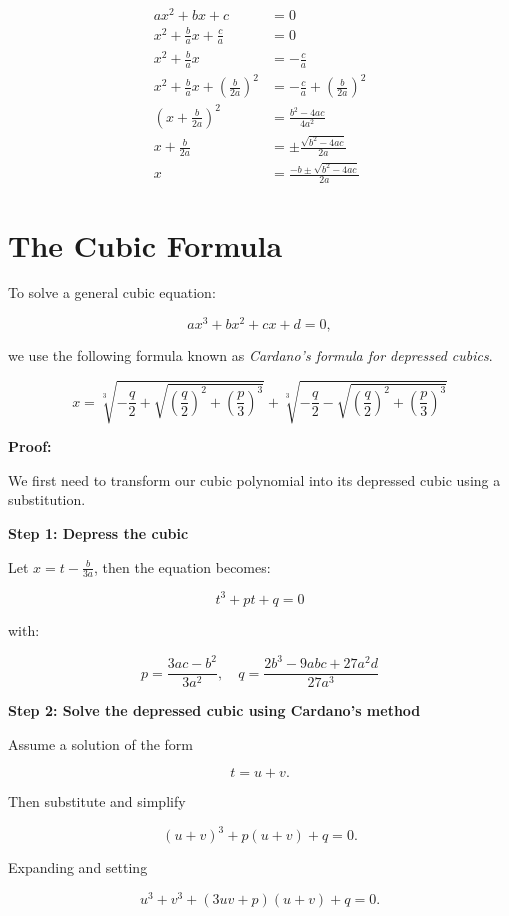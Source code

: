 \begin{align*}
    ax^2 + bx + c &= 0 \\
    x^2 + \frac{b}{a}x + \frac{c}{a} &= 0 \\
    x^2 + \frac{b}{a}x &= -\frac{c}{a} \\
    x^2 + \frac{b}{a}x + {\left(\frac{b}{2a}\right)}^2 &= -\frac{c}{a} + {\left(\frac{b}{2a}\right)}^2 \\
    {\left(x + \frac{b}{2a}\right)}^2 &= \frac{b^2 - 4ac}{4a^2} \\
    x + \frac{b}{2a} &= \pm \frac{\sqrt{b^2 - 4ac}}{2a} \\
    x &= \frac{-b \pm \sqrt{b^2 - 4ac}}{2a}
\end{align*}

\section{The Cubic Formula}

To solve a general cubic equation:

\[
    ax^3 + bx^2 + cx + d = 0,
\]

we use the following formula known as \emph{Cardano’s formula for depressed cubics}.

\[
    x = \sqrt[3]{-\frac{q}{2} + \sqrt{{\left(\frac{q}{2}\right)}^2 + {\left(\frac{p}{3}\right)}^3}} + 
    \sqrt[3]{-\frac{q}{2} - \sqrt{{\left(\frac{q}{2}\right)}^2 + {\left(\frac{p}{3}\right)}^3}}
\]


\textbf{Proof:}

We first need to transform our cubic polynomial into its depressed cubic using a substitution.

\textbf{Step 1: Depress the cubic}

Let \(x = t - \frac{b}{3a}\), then the equation becomes:

\[
    t^3 + pt + q = 0
\]

with:

\[
    p = \frac{3ac - b^2}{3a^2}, \quad q = \frac{2b^3 - 9abc + 27a^2d}{27a^3}
\]

\textbf{Step 2: Solve the depressed cubic using Cardano’s method}

Assume a solution of the form

\[
    t = u + v.
\]

Then substitute and simplify

\[
    {(u+v)}^3 + p(u+v) + q = 0.
\]

Expanding and setting

\[
    u^3 + v^3 + (3uv + p)(u+v) + q = 0.
\]

